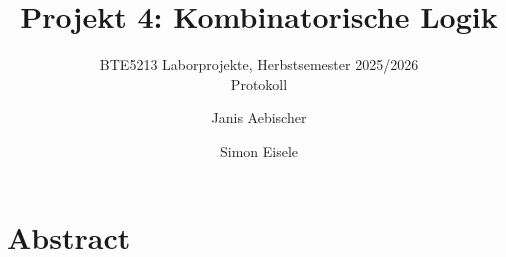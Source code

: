 \documentclass[
  a4paper,
  bibliography=totoc,
  listof=totoc,
  invert-title,
  titleimage-ratio=13
]{bfhpub}
\begin{document}
\frontmatter %

  \title{Projekt 4: Kombinatorische Logik}
  \subtitle{BTE5213 Laborprojekte, Herbstsemester 2025/2026\\Protokoll}
  \author{Janis Aebischer \and Simon Eisele}

  \maketitle

\section*{Abstract}

\thispagestyle{plain}

\clearpage
\tableofcontents

\mainmatter %
\end{document}
